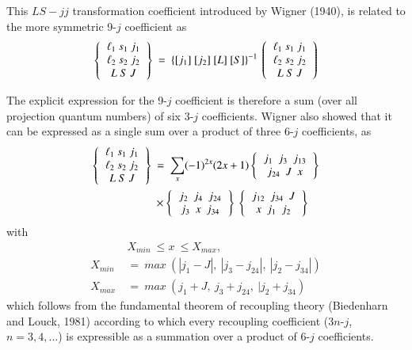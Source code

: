 This $LS-jj$ transformation coefficient introduced by Wigner (1940), is related to the more symmetric 9-$j$ coefficient as
\begin{equation}
\left\{
\begin{tabular}{c}
$\ell_1 \ s_1 \ j_1$\\   
$\ell_2 \ s_2 \ j_2$\\ 
$L \ S \ J$\\ 
\end{tabular}
\right\} \ =\ \{ [j_1]\ [j_2]\ [L]\ [S] \}^{-1}\
\left(
\begin{tabular}{c}
$\ell_1 \ s_1 \ j_1$\\   
$\ell_2 \ s_2 \ j_2$\\ 
$L \ S \ J$\\ 
\end{tabular} 
\right) \label{chap29-eq51}
\end{equation}

The explicit expression for the 9-$j$ coefficient is therefore a sum (over all projection quantum numbers) of six 3-$j$ coefficients. Wigner also showed that it can be expressed as a single sum over a product of three 6-$j$ coefficients, as
\begin{equation}
\begin{split}
\left\{
\begin{tabular}{c}
$\ell_1 \ s_1 \ j_1$\\   
$\ell_2 \ s_2 \ j_2$\\ 
$L \ S \ J$\\ \end{tabular} 
\right\} \
& =\ \sum_x (-1)^{2x} (2x+1) 
\left\{ 
\begin{tabular}{c}
$j_1\ \ j_3\ \ j_{13}$\\ 
$j_{24}\ \ J\ \ x$ \\ 
\end{tabular} 
\right\}\\
& \times \left\{
\begin{tabular}{c}
$j_2\ \ j_4\ \ j_{24}$\\ 
$j_{3}\ \ x\ \ j_{34}$ \\ 
\end{tabular} 
\right\} \
\left\{ 
\begin{tabular}{c} 
$j_{12}\ \ j_{34}\ \ J$\\ 
$x\ \ j_1\ \ j_2$ \\ 
\end{tabular} 
\right\} \label{chap29-eq52}
\end{split}
\end{equation}
with 
\begin{equation}
\begin{split}
& X_{min} \ \leq x \ \leq X_{max},\\
X_{min} \ & =\ max \ (|j_1-J|,\ |j_3-j_{24}|,\ |j_2-j_{34}|)\\
X_{max} \ & =\ max \ (j_1+J,\ j_3+j_{24},\ |j_2+j_{34})\label{chap29-eq53}
\end{split}
\end{equation}
which follows from the fundamental theorem of recoupling theory (Biedenharn and Louck, 1981) according to which every recoupling coefficient (3$n$-$j$, $n=3,4,\ldots$) is expressible as a summation over a product of 6-$j$ coefficients.

